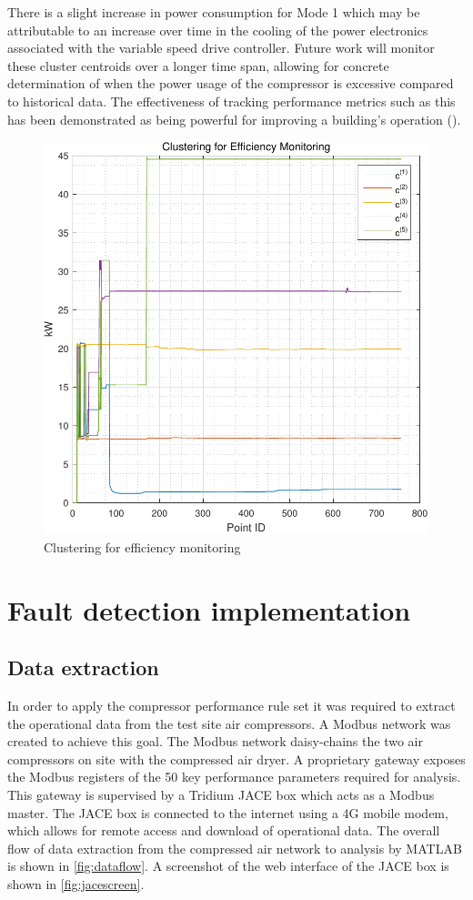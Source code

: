 There is a slight increase in power consumption for Mode 1 which may be attributable to an increase over time in the cooling of the power electronics associated with the variable speed drive controller. Future work will monitor these cluster centroids over a longer time span, allowing for concrete determination of when the power usage of the compressor is excessive compared to historical data. The effectiveness of tracking performance metrics such as this has been demonstrated as being powerful for improving a building's operation (\cite{OSullivan2004}).

\begin{figure}
\includegraphics[width = \columnwidth]{./Images/EfficiencyDegradation.pdf}
\caption{Clustering for efficiency monitoring}
\label{fig:efficiencymonitoring}
\end{figure}

\section{Fault detection implementation}
\subsection{Data extraction}
In order to apply the compressor performance rule set it was required to extract the operational data from the test site air compressors. A Modbus network was created to achieve this goal. The Modbus network daisy-chains the two air compressors on site with the compressed air dryer. A proprietary gateway exposes the Modbus registers of the 50 key performance parameters required for analysis. This gateway is supervised by a Tridium JACE box which acts as a Modbus master. The JACE box is connected to the internet using a 4G mobile modem, which allows for remote access and download of operational data. The overall flow of data extraction from the compressed air network to analysis by MATLAB is shown in \autoref{fig:dataflow}. A screenshot of the web interface of the JACE box is shown in \autoref{fig:jacescreen}.


